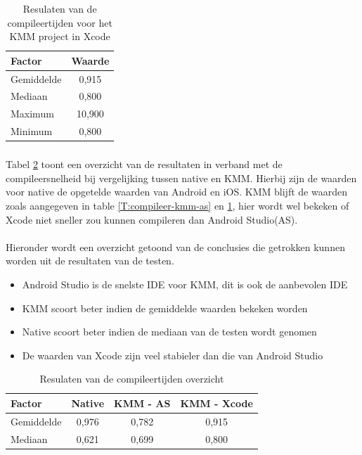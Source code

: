 \begin{table}[H]
    \centering
    \caption{Resulaten van de compileertijden voor het KMM project in Xcode}
    \begin{tabular}{|l|c|}
        \hline
        {\textbf{Factor}} & {\textbf{Waarde}} \\ \hline \hline
        Gemiddelde&0,915\\ \hline
        Mediaan&0,800\\ \hline
        Maximum&10,900\\ \hline
        Minimum&0,800\\ \hline
    \end{tabular}
    \label{T:compileer-kmm-xcode}
\end{table}

\subsubsection{}
\label{sec:M-test-compileersnelheid-conclusie}
Tabel \ref{T:compileer-overzicht} toont een overzicht van de resultaten in verband met de compileersnelheid bij vergelijking tussen native en KMM. Hierbij zijn de waarden voor native de opgetelde waarden van Android en iOS. KMM blijft de waarden zoals aangegeven in table \ref{T:compileer-kmm-as} en \ref{T:compileer-kmm-xcode}, hier wordt wel bekeken of Xcode niet sneller zou kunnen compileren dan Android Studio(AS).
\\ \\
Hieronder wordt een overzicht getoond van de conclusies die getrokken kunnen worden uit de resultaten van de testen.

\begin{itemize}
    \item Android Studio is de snelste IDE voor KMM, dit is ook de aanbevolen IDE
    \item KMM scoort beter indien de gemiddelde waarden bekeken worden
    \item Native scoort beter indien de mediaan van de testen wordt genomen
    \item De waarden van Xcode zijn veel stabieler dan die van Android Studio
\end{itemize}

\begin{table}[H]
    \centering
    \caption{Resulaten van de compileertijden overzicht}
    \begin{tabular}{|l|c|c|c|}
        \hline
        {\textbf{Factor}} & {\textbf{Native}}  & {\textbf{KMM - AS}} & {\textbf{KMM - Xcode}}\\ \hline \hline
        Gemiddelde&0,976&0,782&0,915\\ \hline
        Mediaan&0,621&0,699&0,800\\ \hline
    \end{tabular}
    \label{T:compileer-overzicht}
\end{table}

